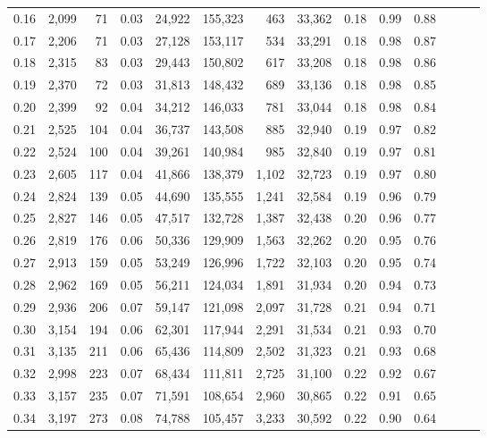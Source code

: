\begin{tabular}{rrrrrrrrrrrrrr}
0.16 &  2,099 &   71 &  0.03 &   24,922 &  155,323 &     463 &  33,362 &  0.18 &  0.99 &      0.88 \\
0.17 &  2,206 &   71 &  0.03 &   27,128 &  153,117 &     534 &  33,291 &  0.18 &  0.98 &      0.87 \\
0.18 &  2,315 &   83 &  0.03 &   29,443 &  150,802 &     617 &  33,208 &  0.18 &  0.98 &      0.86 \\
0.19 &  2,370 &   72 &  0.03 &   31,813 &  148,432 &     689 &  33,136 &  0.18 &  0.98 &      0.85 \\
0.20 &  2,399 &   92 &  0.04 &   34,212 &  146,033 &     781 &  33,044 &  0.18 &  0.98 &      0.84 \\
0.21 &  2,525 &  104 &  0.04 &   36,737 &  143,508 &     885 &  32,940 &  0.19 &  0.97 &      0.82 \\
0.22 &  2,524 &  100 &  0.04 &   39,261 &  140,984 &     985 &  32,840 &  0.19 &  0.97 &      0.81 \\
0.23 &  2,605 &  117 &  0.04 &   41,866 &  138,379 &   1,102 &  32,723 &  0.19 &  0.97 &      0.80 \\
0.24 &  2,824 &  139 &  0.05 &   44,690 &  135,555 &   1,241 &  32,584 &  0.19 &  0.96 &      0.79 \\
0.25 &  2,827 &  146 &  0.05 &   47,517 &  132,728 &   1,387 &  32,438 &  0.20 &  0.96 &      0.77 \\
0.26 &  2,819 &  176 &  0.06 &   50,336 &  129,909 &   1,563 &  32,262 &  0.20 &  0.95 &      0.76 \\
0.27 &  2,913 &  159 &  0.05 &   53,249 &  126,996 &   1,722 &  32,103 &  0.20 &  0.95 &      0.74 \\
0.28 &  2,962 &  169 &  0.05 &   56,211 &  124,034 &   1,891 &  31,934 &  0.20 &  0.94 &      0.73 \\
0.29 &  2,936 &  206 &  0.07 &   59,147 &  121,098 &   2,097 &  31,728 &  0.21 &  0.94 &      0.71 \\
0.30 &  3,154 &  194 &  0.06 &   62,301 &  117,944 &   2,291 &  31,534 &  0.21 &  0.93 &      0.70 \\
0.31 &  3,135 &  211 &  0.06 &   65,436 &  114,809 &   2,502 &  31,323 &  0.21 &  0.93 &      0.68 \\
0.32 &  2,998 &  223 &  0.07 &   68,434 &  111,811 &   2,725 &  31,100 &  0.22 &  0.92 &      0.67 \\
0.33 &  3,157 &  235 &  0.07 &   71,591 &  108,654 &   2,960 &  30,865 &  0.22 &  0.91 &      0.65 \\
0.34 &  3,197 &  273 &  0.08 &   74,788 &  105,457 &   3,233 &  30,592 &  0.22 &  0.90 &      0.64 \\

\end{tabular}
